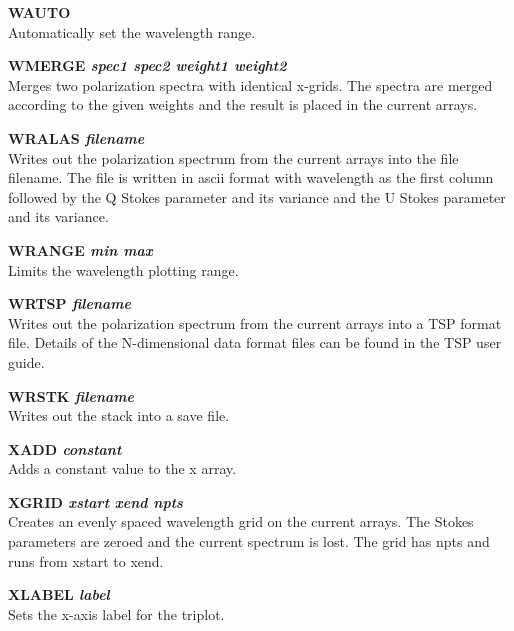 \documentclass[11pt,nolof,noabs]{starlink}
\begin{document}
\textbf{WAUTO} \\
Automatically set the wavelength range.

\textbf{WMERGE \it spec1 spec2 weight1 weight2} \\
Merges two polarization spectra with identical x-grids. The spectra
are merged according to the given weights and the result is placed in
the current arrays.

\textbf{WRALAS \it filename} \\
Writes out the polarization spectrum from the current arrays into the
file filename. The file is written in ascii format with wavelength as
the first column followed by the Q Stokes parameter and its variance
and the U Stokes parameter and its variance.

\textbf{WRANGE \it min max } \\
Limits the wavelength plotting range.

\textbf{WRTSP \it filename } \\
Writes out the polarization spectrum from the current arrays into a  TSP
format file. Details of the N-dimensional data format files can
be found in the  TSP user guide.

\textbf{WRSTK \it filename } \\
Writes out the stack into a save file.

\textbf{XADD \it constant} \\
Adds a constant value to the x array.

\textbf{XGRID \it xstart xend npts} \\
Creates an evenly spaced wavelength grid on the current arrays. The Stokes
parameters are zeroed and the current spectrum is lost. The grid has npts and
runs from xstart to xend.

\textbf{XLABEL \it label} \\
Sets the x-axis label for the triplot.
\end{document}
